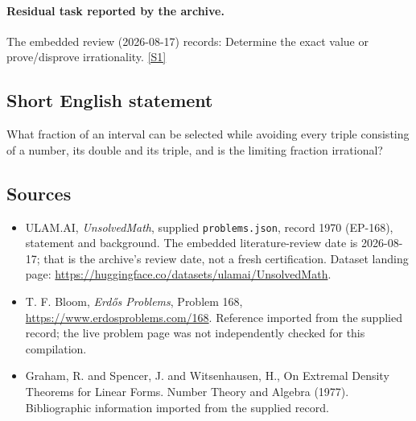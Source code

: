\documentclass[11pt,a4paper]{article}
\newcommand{\sref}[2]{\hyperlink{source:#1:#2}{[S#2]}}
\begin{document}
\paragraph{Residual task reported by the archive.}

The embedded review (2026-08-17) records: Determine the exact value or prove/disprove irrationality. \sref{1970}{1}

\subsection{Short English statement}

What fraction of an interval can be selected while avoiding every triple consisting of a number, its double and its triple, and is the limiting fraction irrational?

\subsection{Sources}

{\small

\begin{itemize}

\item[\hypertarget{source:1970:1}{S1}] ULAM.AI, \emph{UnsolvedMath}, supplied \texttt{problems.json}, record 1970 (EP-168), statement and background. The embedded literature-review date is 2026-08-17; that is the archive’s review date, not a fresh certification. Dataset landing page: \url{https://huggingface.co/datasets/ulamai/UnsolvedMath}.

\item[\hypertarget{source:1970:2}{S2}] T. F. Bloom, \emph{Erdős Problems}, Problem 168, \url{https://www.erdosproblems.com/168}. Reference imported from the supplied record; the live problem page was not independently checked for this compilation.

\item[\hypertarget{source:1970:3}{S3}] Graham, R. and Spencer, J. and Witsenhausen, H., On Extremal Density Theorems for Linear Forms. Number Theory and Algebra (1977). Bibliographic information imported from the supplied record.

\end{itemize}

}

\label{end:1970}
\end{document}
